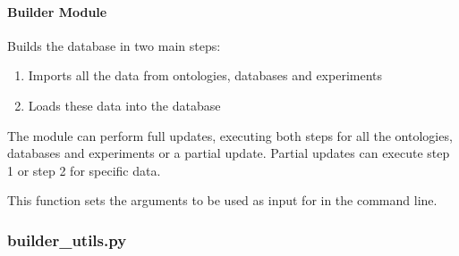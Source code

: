 \documentclass[letterpaper,10pt,english]{sphinxmanual}
\begin{document}
\paragraph{Builder Module}
\label{\detokenize{_autosummary/graphdb_builder.builder:module-graphdb_builder.builder.builder}}\label{\detokenize{_autosummary/graphdb_builder.builder:builder-module}}
Builds the database in two main steps:
\begin{enumerate}
%
\item {} 
Imports all the data from ontologies, databases and experiments

\item {} 
Loads these data into the database

\end{enumerate}

The module can perform full updates, executing both steps for all the ontologies,
databases and experiments or a partial update. Partial updates can execute step 1 or
step 2 for specific data.

\begin{fulllineitems}
\label{\detokenize{_autosummary/graphdb_builder.builder:graphdb_builder.builder.builder.set_arguments}}
This function sets the arguments to be used as input for  in the command line.

\end{fulllineitems}



\subsubsection{builder\_utils.py}
\label{\detokenize{_autosummary/graphdb_builder:module-graphdb_builder.builder_utils}}\label{\detokenize{_autosummary/graphdb_builder:builder-utils-py}}
\end{document}
